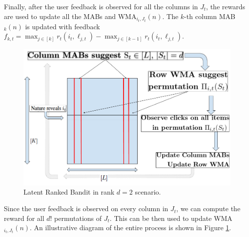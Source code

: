 

Finally, after the user feedback is observed for all the columns in  $J_t$, the rewards are used to update all the MABs and  WMA$_{i_t,J_t}(n)$. The $k$-th column MAB$_k(n)$ is updated with feedback $f_{k,t} = \max_{j\in [k]} r_t(i_t, \ell_{j,t}) - \max_{j\in [k-1]} r_t(i_t,\ell_{j,t})$.

\begin{figure}
    \includegraphics[scale=0.2]{img/RankedBand.png}
    \caption{Latent Ranked Bandit in rank $d=2$ scenario.}
    \label{fig:rankedbandit}
    \vspace*{-1em}
\end{figure}

Since the user feedback is observed on every column in $J_t$, we can compute the reward for all $d!$ permutations of $J_t$. This can be then used to update WMA$_{i_t,J_t}(n)$.    An illustrative diagram of the entire process is shown in Figure \ref{fig:rankedbandit}.

